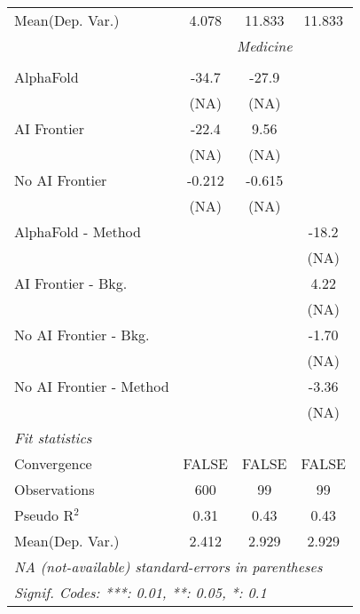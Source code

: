 \begin{tabular}{lccc}
Mean(Dep. Var.) & 4.078 & 11.833 & 11.833 \\
 & \multicolumn{3}{c}{\textit{Medicine}} \\ \\
   AlphaFold               & -34.7  & -27.9  &   \\   
                           & (NA)   & (NA)   &   \\   
   AI Frontier             & -22.4  & 9.56   &   \\   
                           & (NA)   & (NA)   &   \\   
   No AI Frontier          & -0.212 & -0.615 &   \\   
                           & (NA)   & (NA)   &   \\   
   AlphaFold - Method      &        &        & -18.2\\   
                           &        &        & (NA)\\   
   AI Frontier - Bkg.      &        &        & 4.22\\   
                           &        &        & (NA)\\   
   No AI Frontier - Bkg.   &        &        & -1.70\\   
                           &        &        & (NA)\\   
   No AI Frontier - Method &        &        & -3.36\\   
                           &        &        & (NA)\\   
   \midrule
   \emph{Fit statistics}\\
   Convergence             &FALSE   & FALSE  & FALSE\\  
   Observations            & 600    & 99     & 99\\  
   Pseudo R$^2$            & 0.31   & 0.43   & 0.43\\  
Mean(Dep. Var.) & 2.412 & 2.929 & 2.929 \\
   \midrule \midrule
   \multicolumn{4}{l}{\emph{NA (not-available) standard-errors in parentheses}}\\
   \multicolumn{4}{l}{\emph{Signif. Codes: ***: 0.01, **: 0.05, *: 0.1}}\\
\end{tabular}
\par\endgroup
